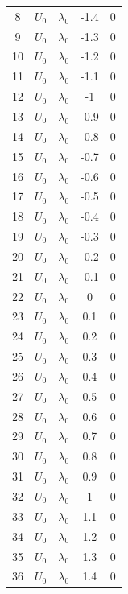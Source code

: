\documentclass[12pt,letterpaper]{scrreprt}
\begin{document}
\begin{appendices}
\begin{table}[!ht]
{\begin{tabular}{c|c|c|c|c}
8   & $U_0$        & $\lambda_0$ & -1.4  & 0   \\
9   & $U_0$        & $\lambda_0$ & -1.3  & 0   \\
10  & $U_0$        & $\lambda_0$ & -1.2  & 0   \\
11  & $U_0$        & $\lambda_0$ & -1.1  & 0   \\
12  & $U_0$        & $\lambda_0$ & -1    & 0   \\
13  & $U_0$        & $\lambda_0$ & -0.9  & 0   \\
14  & $U_0$        & $\lambda_0$ & -0.8  & 0   \\
15  & $U_0$        & $\lambda_0$ & -0.7  & 0   \\
16  & $U_0$        & $\lambda_0$ & -0.6  & 0   \\
17  & $U_0$        & $\lambda_0$ & -0.5  & 0   \\
18  & $U_0$        & $\lambda_0$ & -0.4  & 0   \\
19  & $U_0$        & $\lambda_0$ & -0.3  & 0   \\
20  & $U_0$        & $\lambda_0$ & -0.2  & 0   \\
21  & $U_0$        & $\lambda_0$ & -0.1  & 0   \\
22  & $U_0$        & $\lambda_0$ & 0     & 0   \\
23  & $U_0$        & $\lambda_0$ & 0.1   & 0   \\
24  & $U_0$        & $\lambda_0$ & 0.2   & 0   \\
25  & $U_0$        & $\lambda_0$ & 0.3   & 0   \\
26  & $U_0$        & $\lambda_0$ & 0.4   & 0   \\
27  & $U_0$        & $\lambda_0$ & 0.5   & 0   \\
28  & $U_0$        & $\lambda_0$ & 0.6   & 0   \\
29  & $U_0$        & $\lambda_0$ & 0.7   & 0   \\
30  & $U_0$        & $\lambda_0$ & 0.8   & 0   \\
31  & $U_0$        & $\lambda_0$ & 0.9   & 0   \\
32  & $U_0$        & $\lambda_0$ & 1     & 0   \\
33  & $U_0$        & $\lambda_0$ & 1.1   & 0   \\
34  & $U_0$        & $\lambda_0$ & 1.2   & 0   \\
35  & $U_0$        & $\lambda_0$ & 1.3   & 0   \\
36  & $U_0$        & $\lambda_0$ & 1.4   & 0   \\

\end{tabular}}
\end{table}
\end{appendices}
\end{document}
